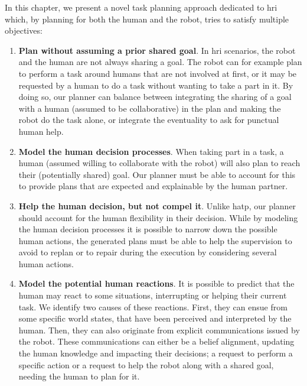 \documentclass[a4paper,11pt,twoside]{StyleThese}
\begin{document}
\smallskip

In this chapter, we present a novel task planning approach dedicated to \acrshort{hri} which, by planning for both the human and the robot, tries to satisfy multiple objectives:

\begin{enumerate}
\item \textbf{Plan without assuming a prior shared goal}. In \acrshort{hri} scenarios, the robot and the human are not always sharing a goal. The robot can for example plan to perform a task around humans that are not involved at first, or it may be requested by a human to do a task without wanting to take a part in it. By doing so, our planner can balance between integrating the sharing of a goal with a human (assumed to be collaborative) in the plan and making the robot do the task alone, or integrate the eventuality to ask for punctual human help.

\item \textbf{Model the human decision processes}. When taking part in a task, a human (assumed willing to collaborate with the robot) will also plan to reach their (potentially shared) goal. Our planner must be able to account for this to provide plans that are expected and explainable by the human partner.

\item \textbf{Help the human decision, but not compel it}. Unlike \acrshort{hatp}, our planner should account for the human flexibility in their decision. While by modeling the human decision processes it is possible to narrow down the possible human actions, the generated plans must be able to help the supervision to avoid to replan or to repair during the execution by considering several human actions.

\item \textbf{Model the potential human reactions}. It is possible to predict that the human may react to some situations, interrupting or helping their current task. We identify two causes of these reactions. First, they can ensue from some specific world states, that have been perceived and interpreted by the human. Then, they can also originate from explicit communications issued by the robot. These communications can either be a belief alignment, updating the human knowledge and impacting their decisions; a request to perform a specific action or a request to help the robot along with a shared goal, needing the human to plan for it.


\end{enumerate}
\end{document}
